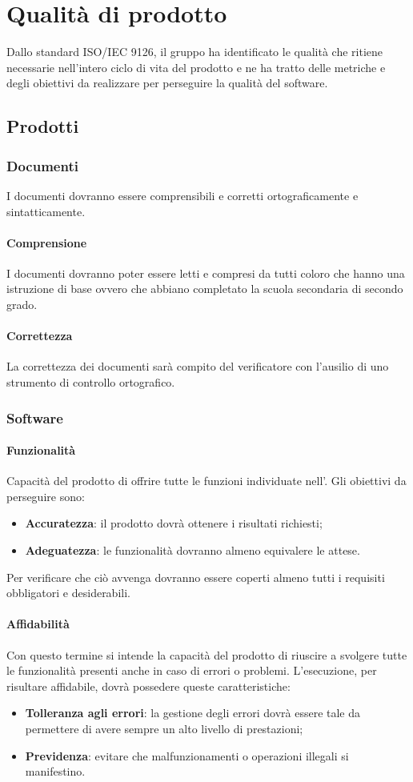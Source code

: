 \section{Qualità di prodotto}
Dallo standard ISO/IEC 9126, il gruppo \Gruppo ha identificato le qualità che ritiene necessarie nell'intero ciclo di vita del prodotto e ne ha tratto delle metriche e degli obiettivi da realizzare per perseguire la qualità del software. 
\subsection{Prodotti}
\subsubsection{Documenti}
I documenti dovranno essere comprensibili e corretti ortograficamente e sintatticamente.
\paragraph{Comprensione}
I documenti dovranno poter essere letti e compresi da tutti coloro che hanno una istruzione di base ovvero che abbiano completato la scuola secondaria di secondo grado.
\paragraph{Correttezza}
La correttezza dei documenti sarà compito del verificatore con l'ausilio di uno strumento di controllo ortografico.
\subsubsection{Software}
\paragraph{Funzionalità}
Capacità del prodotto di offrire tutte le funzioni individuate nell'\Adr. Gli obiettivi da perseguire sono:
\begin{itemize}
\item \textbf{Accuratezza}: il prodotto dovrà ottenere i risultati richiesti;
\item \textbf{Adeguatezza}: le funzionalità dovranno almeno equivalere le attese.
\end{itemize}
Per verificare che ciò avvenga dovranno essere coperti almeno tutti i requisiti obbligatori e desiderabili.
\paragraph{Affidabilità}
Con questo termine si intende la capacità del prodotto di riuscire a svolgere tutte le funzionalità presenti anche in caso di errori o problemi. L'esecuzione, per risultare affidabile, dovrà possedere queste caratteristiche:
\begin{itemize}
\item \textbf{Tolleranza agli errori}: la gestione degli errori dovrà essere tale da permettere di avere sempre un alto livello di prestazioni;
\item \textbf{Previdenza}: evitare che malfunzionamenti o operazioni illegali si manifestino.
\end{itemize}
